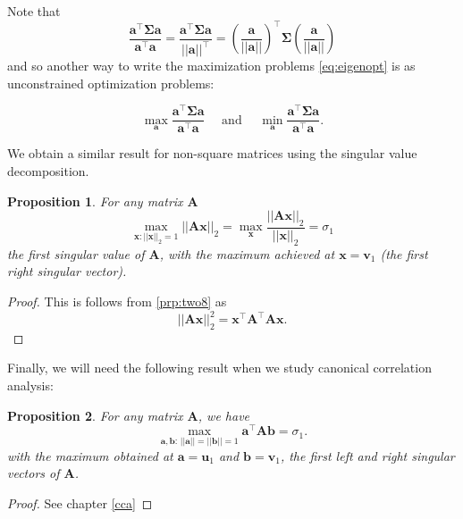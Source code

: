 \documentclass[]{book}
\newtheorem{proposition}{Proposition}[chapter]
\theoremstyle{definition}
\theoremstyle{definition}
\theoremstyle{definition}
\theoremstyle{remark}
\begin{document}
Note that \[\frac{\boldsymbol a^\top \boldsymbol \Sigma\boldsymbol a}{\boldsymbol a^\top\boldsymbol a}=\frac{\boldsymbol a^\top \boldsymbol \Sigma\boldsymbol a}{||\boldsymbol a||^\top} = (\frac{\boldsymbol a}{||\boldsymbol a||})^\top \boldsymbol \Sigma(\frac{\boldsymbol a}{||\boldsymbol a||})\]
and so another way to write the maximization problems \eqref{eq:eigenopt} is as unconstrained optimization problems:

\[\max_{\boldsymbol a}\frac{\boldsymbol a^\top \boldsymbol \Sigma\boldsymbol a}{\boldsymbol a^\top\boldsymbol a}\quad \mbox{ and } \quad \min_{\boldsymbol a}\frac{\boldsymbol a^\top \boldsymbol \Sigma\boldsymbol a}{\boldsymbol a^\top\boldsymbol a}.\]

We obtain a similar result for non-square matrices using the singular value decomposition.

\begin{proposition}
\protect\hypertarget{prp:svdmax1}{}{\label{prp:svdmax1} }For any matrix \(\boldsymbol A\)
\[\max_{\boldsymbol x: ||\boldsymbol x||_2=1}||\boldsymbol A\boldsymbol x||_2=\max_{\boldsymbol x}\frac{||\boldsymbol A\boldsymbol x||_2}{||\boldsymbol x||_2}=\sigma_1\]
the first singular value of \(\boldsymbol A\), with the maximum achieved at \(\boldsymbol x=\boldsymbol v_1\) (the first right singular vector).
\end{proposition}
\begin{proof}
{}This is follows from \ref{prp:two8} as
\[||\boldsymbol A\boldsymbol x||_2^2=\boldsymbol x^\top \boldsymbol A^\top\boldsymbol A\boldsymbol x.\]
\end{proof}

Finally, we will need the following result when we study canonical correlation analysis:

\begin{proposition}
\protect\hypertarget{prp:svdmax2}{}{\label{prp:svdmax2} }For any matrix \(\boldsymbol A\), we have
\[
\max_{\boldsymbol a, \boldsymbol b:\, \vert \vert \boldsymbol a\vert \vert=\vert \vert \boldsymbol b\vert \vert =1} \boldsymbol a^\top \boldsymbol A\boldsymbol b=\sigma_1.
\]
with the maximum obtained at \(\boldsymbol a=\boldsymbol u_1\) and \(\boldsymbol b=\boldsymbol v_1\), the first left and right singular vectors of \(\boldsymbol A\).
\end{proposition}

\begin{proof}
{}See chapter \ref{cca}
\end{proof}
\end{document}
